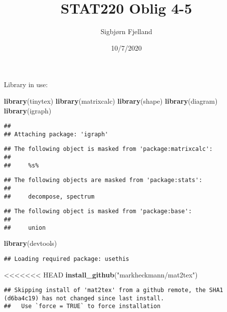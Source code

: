 \documentclass[]{article}
\title{STAT220 Oblig 4-5}
\author{Sigbjørn Fjelland}
\date{10/7/2020}
\newenvironment{Shaded}{\begin{snugshade}}{\end{snugshade}}
\newcommand{\KeywordTok}[1]{\textcolor[rgb]{0.13,0.29,0.53}{\textbf{#1}}}
\newcommand{\NormalTok}[1]{#1}
\newcommand{\StringTok}[1]{\textcolor[rgb]{0.31,0.60,0.02}{#1}}
\begin{document}
\maketitle

Library in use:

\begin{Shaded}
\begin{Highlighting}[]
\KeywordTok{library}\NormalTok{(tinytex)}
\KeywordTok{library}\NormalTok{(matrixcalc)}
\KeywordTok{library}\NormalTok{(shape)}
\KeywordTok{library}\NormalTok{(diagram)}
\KeywordTok{library}\NormalTok{(igraph)}
\end{Highlighting}
\end{Shaded}

\begin{verbatim}
## 
## Attaching package: 'igraph'
\end{verbatim}

\begin{verbatim}
## The following object is masked from 'package:matrixcalc':
## 
##     %s%
\end{verbatim}

\begin{verbatim}
## The following objects are masked from 'package:stats':
## 
##     decompose, spectrum
\end{verbatim}

\begin{verbatim}
## The following object is masked from 'package:base':
## 
##     union
\end{verbatim}

\begin{Shaded}
\begin{Highlighting}[]
\KeywordTok{library}\NormalTok{(devtools)}
\end{Highlighting}
\end{Shaded}

\begin{verbatim}
## Loading required package: usethis
\end{verbatim}

\begin{Shaded}
\begin{Highlighting}[]
<<<<<<< HEAD
\KeywordTok{install_github}\NormalTok{(}\StringTok{"markheckmann/mat2tex"}\NormalTok{)}
\end{Highlighting}
\end{Shaded}

\begin{verbatim}
## Skipping install of 'mat2tex' from a github remote, the SHA1 (d6ba4c19) has not changed since last install.
##   Use `force = TRUE` to force installation
\end{verbatim}
\end{document}
